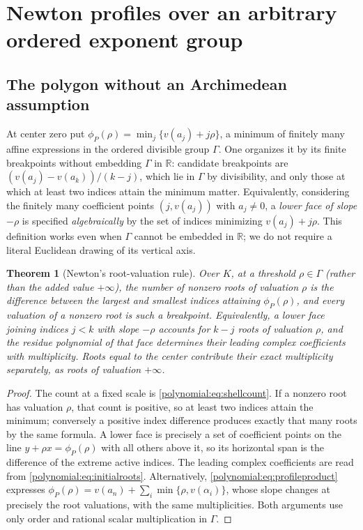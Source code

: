 \documentclass[11pt,letterpaper]{article}
\numberwithin{equation}{section}
\newtheorem{theorem}{Theorem}[section]
\theoremstyle{definition}
\theoremstyle{remark}\newtheorem{remark}[theorem]{Remark}
\newcommand{\R}{\mathbb R}
\begin{document}
\section{Newton profiles over an arbitrary ordered exponent group}
\label{polynomial:sec:newton}

\subsection{The polygon without an Archimedean assumption}
At center zero put $\phi_P(\rho)=\min_j\{v(a_j)+j\rho\}$, a minimum of
finitely many affine expressions in the ordered divisible group $\Gamma$. One
organizes it by its finite breakpoints without embedding $\Gamma$ in $\R$:
candidate breakpoints are $(v(a_j)-v(a_k))/(k-j)$, which lie in $\Gamma$ by
divisibility, and only those at which at least two indices attain the minimum
matter. Equivalently, considering the finitely many coefficient points
$(j,v(a_j))$ with $a_j\ne0$, a \emph{lower face of slope $-\rho$} is specified
\emph{algebraically} by the set of indices minimizing $v(a_j)+j\rho$. This
definition works even when $\Gamma$ cannot be embedded in $\R$; we do not
require a literal Euclidean drawing of its vertical axis.

\begin{theorem}[Newton's root-valuation rule]\label{polynomial:thm:newton}
Over $K$, at a threshold $\rho\in\Gamma$ (rather than the added value
$+\infty$), the number of nonzero roots of
valuation $\rho$ is the difference between the largest and smallest indices
attaining $\phi_P(\rho)$, and every valuation of a nonzero root is such a
breakpoint. Equivalently, a lower face joining indices $j<k$ with slope
$-\rho$ accounts for $k-j$ roots of valuation $\rho$, and the residue
polynomial of that face determines their leading complex coefficients with
multiplicity. Roots equal to the center contribute their exact multiplicity
separately, as roots of valuation $+\infty$.
\end{theorem}
\begin{proof}
The count at a fixed scale is \eqref{polynomial:eq:shellcount}. If a nonzero
root has valuation $\rho$, that count is positive, so at least two indices
attain the minimum; conversely a positive index difference produces exactly
that many roots by the same formula. A lower face is precisely a set of
coefficient points on the line $y+\rho x=\phi_P(\rho)$ with all others above
it, so its horizontal span is the difference of the extreme active indices.
The leading complex coefficients are read from
\eqref{polynomial:eq:initialroots}. Alternatively,
\eqref{polynomial:eq:profileproduct} expresses
$\phi_P(\rho)=v(a_n)+\sum_i\min\{\rho,v(\alpha_i)\}$, whose slope changes at
precisely the root valuations, with the same multiplicities. Both arguments
use only order and rational scalar multiplication in $\Gamma$.
\end{proof}
\end{document}
